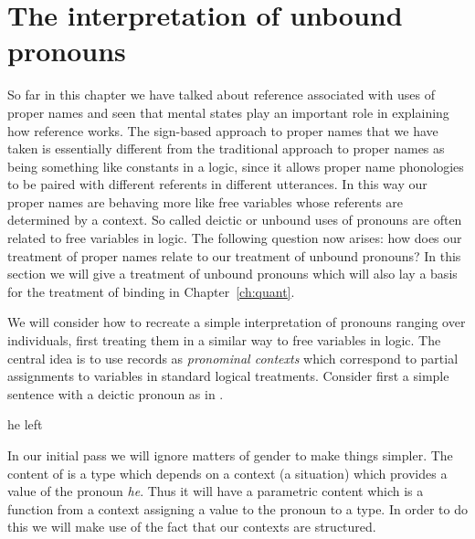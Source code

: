 \section{The interpretation of unbound pronouns}
\label{sec:unbound}
So far in this chapter we have talked about reference associated with
uses of proper names and seen that mental states play
an important role in explaining how reference works.  The sign-based
approach to proper names that we have taken is essentially different
from the traditional approach to proper names as being something like
constants in a logic, since it allows proper name phonologies to be
paired with different referents in different utterances.  In this way
our proper names are behaving more like free variables whose referents
are determined by a context.  So called deictic or unbound uses of
pronouns are often related to free variables in logic.  The following
question now arises:  how does our treatment of proper names relate to
our treatment of unbound pronouns?  In this section we will give a
treatment of unbound pronouns which will also lay a basis for the
treatment of binding in Chapter~\ref{ch:quant}.

We will consider how to recreate a simple interpretation of pronouns
ranging over individuals, first treating them in a similar way to free
variables in logic.  The central idea is to use records as \textit{pronominal
  contexts} which correspond to partial assignments to variables in
standard logical treatments.  Consider first a simple sentence with a deictic
pronoun as in \nexteg{}.
\begin{ex} 
he left 
\end{ex} 
In our initial pass we will ignore matters
of gender to make things simpler.  The content of \preveg{} is a type
which depends on a context (a situation) which provides a value of the
pronoun \textit{he}. Thus it will have a parametric content which is a
function from a context assigning a value to the pronoun to a
type.  In order to do this we will make use of the fact that our
contexts are structured.

